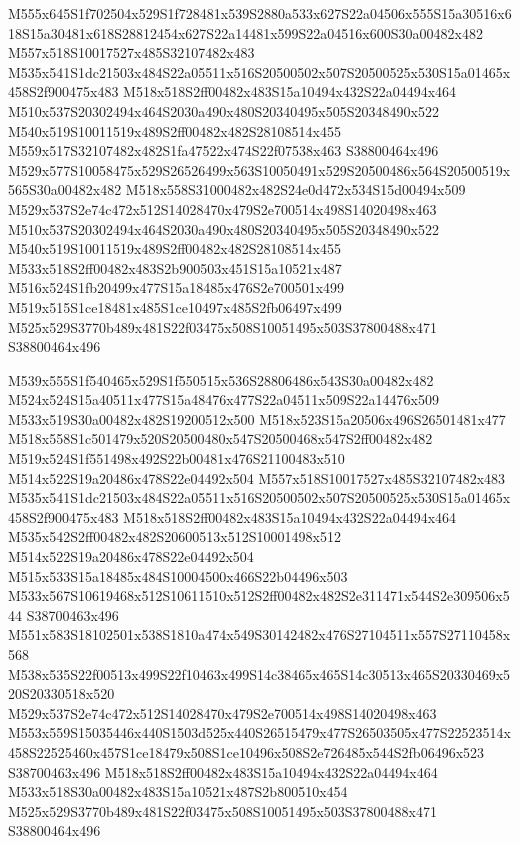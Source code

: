 \documentclass{article}
\begin{document}
\begin{multicols}{2}
M555x645S1f702504x529S1f728481x539S2880a533x627S22a04506x555S15a30516x618S15a30481x618S28812454x627S22a14481x599S22a04516x600S30a00482x482 M557x518S10017527x485S32107482x483 M535x541S1dc21503x484S22a05511x516S20500502x507S20500525x530S15a01465x458S2f900475x483 M518x518S2ff00482x483S15a10494x432S22a04494x464 M510x537S20302494x464S2030a490x480S20340495x505S20348490x522 M540x519S10011519x489S2ff00482x482S28108514x455 M559x517S32107482x482S1fa47522x474S22f07538x463 S38800464x496 M529x577S10058475x529S26526499x563S10050491x529S20500486x564S20500519x565S30a00482x482 M518x558S31000482x482S24e0d472x534S15d00494x509 M529x537S2e74c472x512S14028470x479S2e700514x498S14020498x463 M510x537S20302494x464S2030a490x480S20340495x505S20348490x522 M540x519S10011519x489S2ff00482x482S28108514x455 M533x518S2ff00482x483S2b900503x451S15a10521x487 M516x524S1fb20499x477S15a18485x476S2e700501x499 M519x515S1ce18481x485S1ce10497x485S2fb06497x499 M525x529S3770b489x481S22f03475x508S10051495x503S37800488x471 S38800464x496

M539x555S1f540465x529S1f550515x536S28806486x543S30a00482x482 M524x524S15a40511x477S15a48476x477S22a04511x509S22a14476x509 M533x519S30a00482x482S19200512x500 M518x523S15a20506x496S26501481x477 M518x558S1c501479x520S20500480x547S20500468x547S2ff00482x482 M519x524S1f551498x492S22b00481x476S21100483x510 M514x522S19a20486x478S22e04492x504 M557x518S10017527x485S32107482x483 M535x541S1dc21503x484S22a05511x516S20500502x507S20500525x530S15a01465x458S2f900475x483 M518x518S2ff00482x483S15a10494x432S22a04494x464 M535x542S2ff00482x482S20600513x512S10001498x512 M514x522S19a20486x478S22e04492x504 M515x533S15a18485x484S10004500x466S22b04496x503 M533x567S10619468x512S10611510x512S2ff00482x482S2e311471x544S2e309506x544 S38700463x496 M551x583S18102501x538S1810a474x549S30142482x476S27104511x557S27110458x568 M538x535S22f00513x499S22f10463x499S14c38465x465S14c30513x465S20330469x520S20330518x520 M529x537S2e74c472x512S14028470x479S2e700514x498S14020498x463 M553x559S15035446x440S1503d525x440S26515479x477S26503505x477S22523514x458S22525460x457S1ce18479x508S1ce10496x508S2e726485x544S2fb06496x523 S38700463x496 M518x518S2ff00482x483S15a10494x432S22a04494x464 M533x518S30a00482x483S15a10521x487S2b800510x454 M525x529S3770b489x481S22f03475x508S10051495x503S37800488x471 S38800464x496


\end{multicols}
\end{document}
